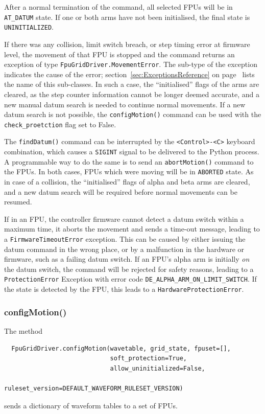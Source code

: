 \documentclass[11pt,a4paper]{scrartcl}
\begin{document}
After a normal termination of the command, all selected FPUs will be
in \texttt{AT\_DATUM} state. If one or both arms have not been
initialised, the final state is \texttt{UNINITIALIZED}.

\begin{sloppypar}
If there was any collision, limit switch breach, or step timing error
at firmware level, the movement of that FPU is stopped and the command
returns an exception of type \texttt{FpuGridDriver.MovementError}. The
sub-type of the exception indicates the cause of the error;
section~\ref{sec:ExceptionsReference} on
page~\pageref{sec:ExceptionsReference} lists the name of this
sub-classes. In such a case, the ``initialised'' flags of the arms
are cleared, as the step counter information cannot be longer deemed
accurate, and a new manual datum search is needed to continue normal
movements. If a new datum search is not possible, the
\texttt{configMotion()} command can be used with the
\texttt{check\_proetction} flag set to False.
\end{sloppypar}


The \texttt{findDatum()} command can be interrupted by the
\texttt{<Control>-<C>} keyboard combination, which causes a
\texttt{SIGINT} signal to be delivered to the Python process. A
programmable way to do the same is to send an \texttt{abortMotion()}
command to the FPUs.  In both cases, FPUs which were moving will be in
\texttt{ABORTED} state. As in case of a collision, the ``initialised''
flags of alpha and beta arms are cleared, and a new datum search will
be required before normal movements can be resumed.

If in an FPU, the controller firmware cannot detect a datum switch
within a maximum time, it aborts the movement and sends a time-out
message, leading to a \texttt{FirmwareTimeoutError} exception. This
can be caused by either issuing the datum command in the wrong place,
or by a malfunction in the hardware or firmware, such as a failing
datum switch. If an FPU's alpha arm is initially \emph{on} the datum
switch, the command will be rejected for safety reasons, leading to a
\texttt{ProtectionError} Exception with error code
\verb+DE_ALPHA_ARM_ON_LIMIT_SWITCH+. If the state is detected by the
FPU, this leads to a \texttt{HardwareProtectionError}.





\subsubsection{configMotion()}
\label{sec:configmotion}
The method
\begin{verbatim}
  FpuGridDriver.configMotion(wavetable, grid_state, fpuset=[],
                             soft_protection=True,
                             allow_uninitialized=False,
                             ruleset_version=DEFAULT_WAVEFORM_RULESET_VERSION)
\end{verbatim}
sends a dictionary of waveform tables to a set of FPUs.
\end{document}
